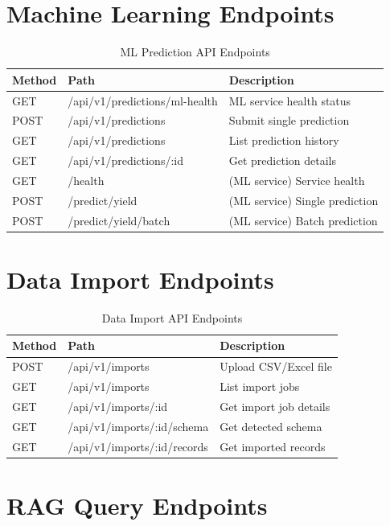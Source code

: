 \section{Machine Learning Endpoints}

\begin{longtable}{lll}
\caption{ML Prediction API Endpoints}
\label{tab:ml-api} \\
\toprule
\textbf{Method} & \textbf{Path} & \textbf{Description} \\
\midrule
\endhead
\midrule
\endfoot
\bottomrule
\endlastfoot
GET & /api/v1/predictions/ml-health & ML service health status \\
POST & /api/v1/predictions & Submit single prediction \\
GET & /api/v1/predictions & List prediction history \\
GET & /api/v1/predictions/:id & Get prediction details \\
GET & /health & (ML service) Service health \\
POST & /predict/yield & (ML service) Single prediction \\
POST & /predict/yield/batch & (ML service) Batch prediction \\
\end{longtable}

\section{Data Import Endpoints}

\begin{longtable}{lll}
\caption{Data Import API Endpoints}
\label{tab:import-api} \\
\toprule
\textbf{Method} & \textbf{Path} & \textbf{Description} \\
\midrule
\endhead
\midrule
\endfoot
\bottomrule
\endlastfoot
POST & /api/v1/imports & Upload CSV/Excel file \\
GET & /api/v1/imports & List import jobs \\
GET & /api/v1/imports/:id & Get import job details \\
GET & /api/v1/imports/:id/schema & Get detected schema \\
GET & /api/v1/imports/:id/records & Get imported records \\
\end{longtable}

\section{RAG Query Endpoints}

